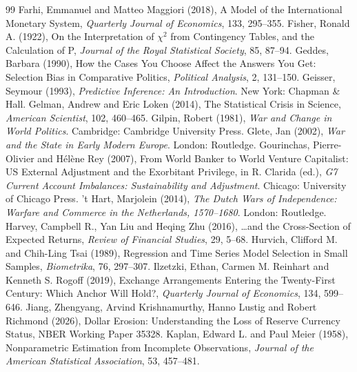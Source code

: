 \documentclass[11pt,letterpaper]{article}
\theoremstyle{definition}
\theoremstyle{plain}
\begin{document}
\begin{thebibliography}{99}
 Farhi, Emmanuel and Matteo Maggiori (2018), A Model of the International Monetary System, \emph{Quarterly Journal of Economics}, 133, 295--355.
 Fisher, Ronald A. (1922), On the Interpretation of $\chi^2$ from Contingency Tables, and the Calculation of P, \emph{Journal of the Royal Statistical Society}, 85, 87--94.
 Geddes, Barbara (1990), How the Cases You Choose Affect the Answers You Get: Selection Bias in Comparative Politics, \emph{Political Analysis}, 2, 131--150.
 Geisser, Seymour (1993), \emph{Predictive Inference: An Introduction}. New York: Chapman \& Hall.
 Gelman, Andrew and Eric Loken (2014), The Statistical Crisis in Science, \emph{American Scientist}, 102, 460--465.
 Gilpin, Robert (1981), \emph{War and Change in World Politics}. Cambridge: Cambridge University Press.
 Glete, Jan (2002), \emph{War and the State in Early Modern Europe}. London: Routledge.
 Gourinchas, Pierre-Olivier and H\'el\`ene Rey (2007), From World Banker to World Venture Capitalist: US External Adjustment and the Exorbitant Privilege, in R. Clarida (ed.), \emph{G7 Current Account Imbalances: Sustainability and Adjustment}. Chicago: University of Chicago Press.
 't Hart, Marjolein (2014), \emph{The Dutch Wars of Independence: Warfare and Commerce in the Netherlands, 1570--1680}. London: Routledge.
 Harvey, Campbell R., Yan Liu and Heqing Zhu (2016), \ldots and the Cross-Section of Expected Returns, \emph{Review of Financial Studies}, 29, 5--68.
 Hurvich, Clifford M. and Chih-Ling Tsai (1989), Regression and Time Series Model Selection in Small Samples, \emph{Biometrika}, 76, 297--307.
 Ilzetzki, Ethan, Carmen M. Reinhart and Kenneth S. Rogoff (2019), Exchange Arrangements Entering the Twenty-First Century: Which Anchor Will Hold?, \emph{Quarterly Journal of Economics}, 134, 599--646.
 Jiang, Zhengyang, Arvind Krishnamurthy, Hanno Lustig and Robert Richmond (2026), Dollar Erosion: Understanding the Loss of Reserve Currency Status, NBER Working Paper 35328.
 Kaplan, Edward L. and Paul Meier (1958), Nonparametric Estimation from Incomplete Observations, \emph{Journal of the American Statistical Association}, 53, 457--481.

\end{thebibliography}
\end{document}
